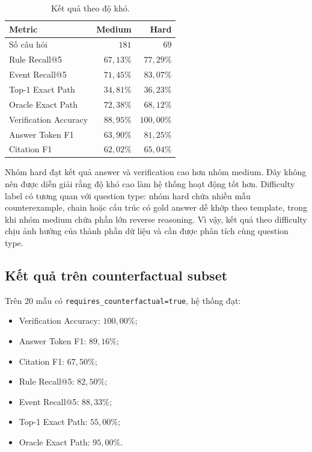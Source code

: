 \begin{table}[t]
    \centering
    \caption{Kết quả theo độ khó.}
    \label{tab:difficulty-results}
    \begin{tabular}{lrr}
        \hline
        \textbf{Metric} & \textbf{Medium} & \textbf{Hard} \\
        \hline
        Số câu hỏi & \(181\) & \(69\) \\
        Rule Recall@5 & \(67{,}13\%\) & \(77{,}29\%\) \\
        Event Recall@5 & \(71{,}45\%\) & \(83{,}07\%\) \\
        Top-1 Exact Path & \(34{,}81\%\) & \(36{,}23\%\) \\
        Oracle Exact Path & \(72{,}38\%\) & \(68{,}12\%\) \\
        Verification Accuracy & \(88{,}95\%\) & \(100{,}00\%\) \\
        Answer Token F1 & \(63{,}90\%\) & \(81{,}25\%\) \\
        Citation F1 & \(62{,}02\%\) & \(65{,}04\%\) \\
        \hline
    \end{tabular}
\end{table}

Nhóm hard đạt kết quả answer và verification cao hơn nhóm medium. Đây không
nên được diễn giải rằng độ khó cao làm hệ thống hoạt động tốt hơn. Difficulty
label có tương quan với question type: nhóm hard chứa nhiều mẫu
counterexample, chain hoặc cấu trúc có gold answer dễ khớp theo template,
trong khi nhóm medium chứa phần lớn reverse reasoning. Vì vậy, kết quả theo
difficulty chịu ảnh hưởng của thành phần dữ liệu và cần được phân tích cùng
question type.

\subsection{Kết quả trên counterfactual subset}

Trên \(20\) mẫu có
\texttt{requires\_counterfactual=true}, hệ thống đạt:

\begin{itemize}
    \item Verification Accuracy: \(100{,}00\%\);
    \item Answer Token F1: \(89{,}16\%\);
    \item Citation F1: \(67{,}50\%\);
    \item Rule Recall@5: \(82{,}50\%\);
    \item Event Recall@5: \(88{,}33\%\);
    \item Top-1 Exact Path: \(55{,}00\%\);
    \item Oracle Exact Path: \(95{,}00\%\).
\end{itemize}

